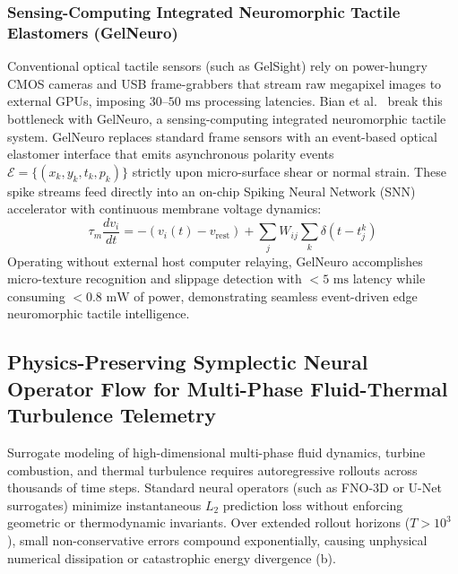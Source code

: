 \subsubsection{Sensing-Computing Integrated Neuromorphic Tactile Elastomers (GelNeuro)}
Conventional optical tactile sensors (such as GelSight) rely on power-hungry CMOS cameras and USB frame-grabbers that stream raw megapixel images to external GPUs, imposing $30$--$50\text{ ms}$ processing latencies. Bian et al.~\cite{Bian2026GelNeuro} break this bottleneck with GelNeuro, a sensing-computing integrated neuromorphic tactile system. GelNeuro replaces standard frame sensors with an event-based optical elastomer interface that emits asynchronous polarity events $\mathcal{E} = \{(x_k, y_k, t_k, p_k)\}$ strictly upon micro-surface shear or normal strain. These spike streams feed directly into an on-chip Spiking Neural Network (SNN) accelerator with continuous membrane voltage dynamics:
\begin{equation}
    \tau_m \frac{dv_i}{dt} = -(v_i(t) - v_{\text{rest}}) + \sum_j W_{ij} \sum_k \delta(t - t_j^k)
\end{equation}
Operating without external host computer relaying, GelNeuro accomplishes micro-texture recognition and slippage detection with $<5\text{ ms}$ latency while consuming $<0.8\text{ mW}$ of power, demonstrating seamless event-driven edge neuromorphic tactile intelligence.

\subsection{Physics-Preserving Symplectic Neural Operator Flow for Multi-Phase Fluid-Thermal Turbulence Telemetry}
\label{sec:symplectic_neural_operator}
Surrogate modeling of high-dimensional multi-phase fluid dynamics, turbine combustion, and thermal turbulence requires autoregressive rollouts across thousands of time steps. Standard neural operators (such as FNO-3D or U-Net surrogates) minimize instantaneous $L_2$ prediction loss without enforcing geometric or thermodynamic invariants. Over extended rollout horizons ($T > 10^3$), small non-conservative errors compound exponentially, causing unphysical numerical dissipation or catastrophic energy divergence (b).

